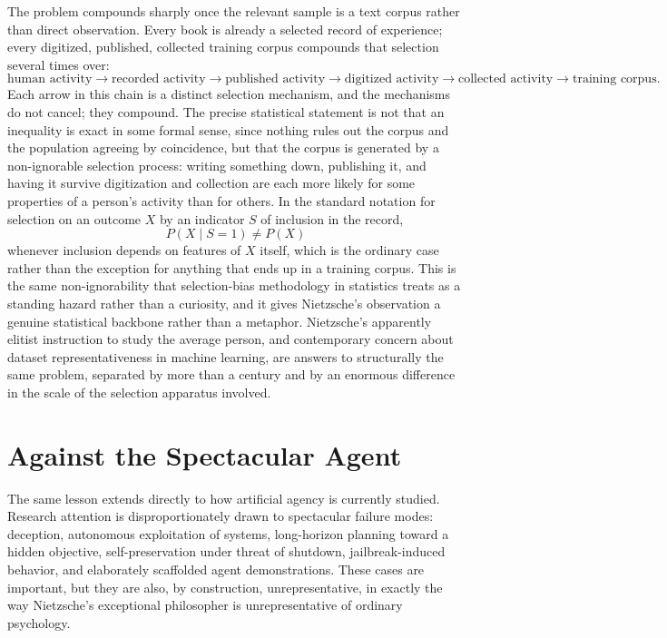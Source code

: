 \documentclass[11pt]{article}
\begin{document}
The problem compounds sharply once the relevant sample is a text corpus rather than direct observation. Every book is already a selected record of experience; every digitized, published, collected training corpus compounds that selection several times over:
\[
\text{human activity} \rightarrow \text{recorded activity} \rightarrow \text{published activity} \rightarrow \text{digitized activity} \rightarrow \text{collected activity} \rightarrow \text{training corpus}.
\]
Each arrow in this chain is a distinct selection mechanism, and the mechanisms do not cancel; they compound. The precise statistical statement is not that an inequality is exact in some formal sense, since nothing rules out the corpus and the population agreeing by coincidence, but that the corpus is generated by a non-ignorable selection process: writing something down, publishing it, and having it survive digitization and collection are each more likely for some properties of a person's activity than for others. In the standard notation for selection on an outcome \(X\) by an indicator \(S\) of inclusion in the record,
\[
P(X \mid S = 1) \neq P(X)
\]
whenever inclusion depends on features of \(X\) itself, which is the ordinary case rather than the exception for anything that ends up in a training corpus. This is the same non-ignorability that selection-bias methodology in statistics treats as a standing hazard rather than a curiosity, and it gives Nietzsche's observation a genuine statistical backbone rather than a metaphor. Nietzsche's apparently elitist instruction to study the average person, and contemporary concern about dataset representativeness in machine learning, are answers to structurally the same problem, separated by more than a century and by an enormous difference in the scale of the selection apparatus involved.

\section{Against the Spectacular Agent}

The same lesson extends directly to how artificial agency is currently studied. Research attention is disproportionately drawn to spectacular failure modes: deception, autonomous exploitation of systems, long-horizon planning toward a hidden objective, self-preservation under threat of shutdown, jailbreak-induced behavior, and elaborately scaffolded agent demonstrations. These cases are important, but they are also, by construction, unrepresentative, in exactly the way Nietzsche's exceptional philosopher is unrepresentative of ordinary psychology.
\end{document}
